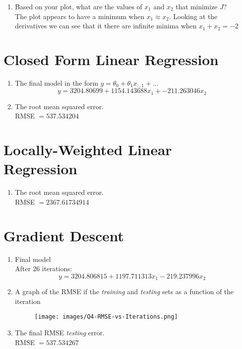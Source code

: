 \documentclass{article}
\begin{document}
\begin{enumerate}
\begin{enumerate}
\item Based on your plot, what are the values of $x_1$ and $x_2$ that minimize $J$?\\
The plot appears to have a minimum when $x_1 \approx x_2$.
Looking at the derivatives we can see that it there are infinite minima when $ x_1 + x_2 = - 2$
\end{enumerate}

\end{enumerate}

\section{Closed Form Linear Regression}\label{linreg}
\begin{enumerate}
\item The final model in the form $y=\theta_0+\theta_1x_{:,1} + ...$\\
$$ y = 3204.80699 + 1154.143688x_1 + -211.263046x_2 $$
\item The root mean squared error.\\
RMSE $ = 537.534204$
\end{enumerate}


\section{Locally-Weighted Linear Regression}
\begin{enumerate}
\item The root mean squared error.\\
RMSE $ =  2367.61734914$ 
\end{enumerate}

\newpage
\section{Gradient Descent}
\begin{enumerate}
\item Final model\\
After 26 iterations:
$$y = 3204.806815 + 1197.711313x_1 - 219.237996x_2$$
\item A graph of the RMSE if the \emph{training} and \emph{testing} sets as a function of the iteration\\
\begin{figure}[h]
    \centering
    \texttt{[image: images/Q4-RMSE-vs-Iterations.png]}
\end{figure}
\item The final RMSE \emph{testing} error.\\
RMSE $ = 537.534267$
\end{enumerate}
\end{document}
